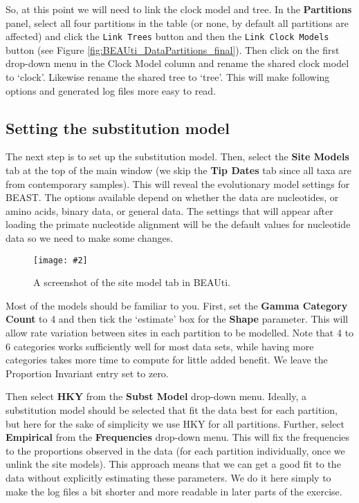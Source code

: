 \documentclass[12pt]{article}
\newcommand{\includeimage}[2][]{%
\texttt{[image: \#2]}
}
\begin{document}
So, at this point we will need to link the clock model and tree. In the {\bf Partitions} panel, select all four partitions in the table (or none, by default all partitions are affected) and click the \texttt{Link Trees} button and then the \texttt{Link Clock Models} button (see Figure \ref{fig:BEAUti_DataPartitions_final}). Then click on the first drop-down menu in the Clock Model column and rename the shared clock model to `clock'. Likewise rename the shared tree to `tree'. This will make following options and generated log files more easy to read.


\subsection{Setting the substitution model}

The next step is to set up the substitution model. 
Then, select the {\bf Site Models} tab at the top of the main window (we skip the {\bf Tip Dates} tab since all taxa are from contemporary
samples). This will reveal the evolutionary model settings for BEAST. The options available depend on whether the data are nucleotides, or amino acids, binary data, or general data. The settings that will appear after loading the primate nucleotide alignment will be the default values for nucleotide data so we need to make some changes. 

\begin{figure}
\centering	
\includeimage[width=0.9\textwidth]{figures/BEAUti_Model}
\caption{A screenshot of the site model tab in BEAUti.}
\label{fig:BEAUti_Model}
\end{figure}

Most of the models should be familiar to you. %
First, set the \textbf{Gamma Category Count} to 4 and then tick the `estimate' box for the \textbf{Shape} parameter. This will allow rate variation 
between sites in each partition to be modelled.  Note that 4 to 6 categories works sufficiently well for most data
sets, while having more categories takes more time to compute for little added benefit. We leave the Proportion Invariant entry set to zero.

Then select  \textbf{HKY} from the \textbf{Subst Model} drop-down menu. Ideally, a substitution model should be selected that fit the data best for each partition, but here for the sake of simplicity we use HKY for all partitions. Further, select \textbf{Empirical} from the \textbf{Frequencies} drop-down menu. This will fix the frequencies to the proportions observed in the data (for each partition individually, once we unlink the site models). This approach means that we can get a good fit to the data without explicitly estimating these parameters. We do it here simply to make the log files a bit shorter and more readable in later parts of the exercise. 
\end{document}
